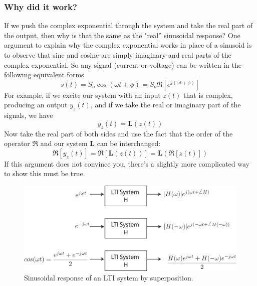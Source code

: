 \subsubsection{Why did it work?}
If we push the complex exponential through the system and take the real part of the output, then why is that the same as the "real'' sinusoidal response?  One argument to explain why the complex exponential works in place of a sinusoid is to observe that sine and cosine are simply imaginary and real parts of the complex exponential.  So any signal (current or voltage) can be written in the following equivalent forms
    \begin{equation}
        s(t) = S_o \cos(\omega t + \phi) = S_o \Re[e^{j(\omega t + \phi)}]
    \end{equation}
For example, if we excite our system with an input $z(t)$ that is complex, producing an output $y_z(t)$, and if we take the real or imaginary part of the signals, we have
    \begin{equation}
        y_z(t) = \mathbf{L}(z(t))
    \end{equation}
Now take the real part of both sides and use the fact that the order of the operator $\Re$ and our system $\mathbf{L}$ can be interchanged:
    \begin{equation}
        \Re[y_z(t)] = \Re[\mathbf{L}(z(t))]  = \mathbf{L} (\Re[z(t)])
    \end{equation}
If this argument does not convince you, there's a slightly more complicated way to show this must be true.
\begin{figure}[tb]
\centering
\includegraphics[width=.75\columnwidth]{lti_cosine}
\caption{Sinusoidal response of an LTI system by superposition. }
\label{fig:lti_cosine}
\end{figure}
